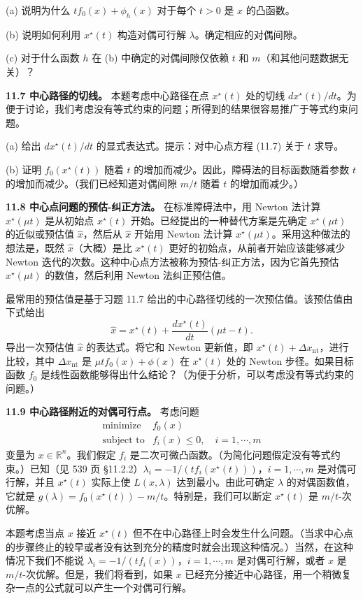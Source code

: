 \documentclass[UTF8,12pt,a4paper,fontset=fandol]{ctexart}
\begin{document}
(a) 说明为什么 $tf_0(x)+\phi_h(x)$ 对于每个 $t>0$ 是 $x$ 的凸函数。

(b) 说明如何利用 $x^\star(t)$ 构造对偶可行解 $\lambda$。确定相应的对偶间隙。

(c) 对于什么函数 $h$ 在 (b) 中确定的对偶间隙仅依赖 $t$ 和 $m$（和其他问题数据无关）？

\noindent\textbf{11.7 中心路径的切线。} 本题考虑中心路径在点 $x^\star(t)$ 处的切线 $dx^\star(t)/dt$。为便于讨论，我们考虑没有等式约束的问题；所得到的结果很容易推广于等式约束问题。

(a) 给出 $dx^\star(t)/dt$ 的显式表达式。提示：对中心点方程 (11.7) 关于 $t$ 求导。

(b) 证明 $f_0(x^\star(t))$ 随着 $t$ 的增加而减少。因此，障碍法的目标函数随着参数 $t$ 的增加而减少。（我们已经知道对偶间隙 $m/t$ 随着 $t$ 的增加而减少。）

\noindent\textbf{11.8 中心点问题的预估-纠正方法。} 在标准障碍法中，用 Newton 法计算 $x^\star(\mu t)$ 是从初始点 $x^\star(t)$ 开始。已经提出的一种替代方案是先确定 $x^\star(\mu t)$ 的近似或预估值 $\hat{x}$，然后从 $\hat{x}$ 开始用 Newton 法计算 $x^\star(\mu t)$。采用这种做法的想法是，既然 $\hat{x}$（大概）是比 $x^\star(t)$ 更好的初始点，从前者开始应该能够减少 Newton 迭代的次数。这种中心点方法被称为预估-纠正方法，因为它首先预估 $x^\star(\mu t)$ 的数值，然后利用 Newton 法纠正预估值。

最常用的预估值是基于习题 11.7 给出的中心路径切线的一次预估值。该预估值由下式给出
\[
\hat{x}=x^\star(t)+\frac{dx^\star(t)}{dt}(\mu t-t).
\]
导出一次预估值 $\hat{x}$ 的表达式。将它和 Newton 更新值，即 $x^\star(t)+\Delta x_{\mathrm{nt}}$，进行比较，其中 $\Delta x_{\mathrm{nt}}$ 是 $\mu t f_0(x)+\phi(x)$ 在 $x^\star(t)$ 处的 Newton 步径。如果目标函数 $f_0$ 是线性函数能够得出什么结论？（为便于分析，可以考虑没有等式约束的问题。）

\noindent\textbf{11.9 中心路径附近的对偶可行点。} 考虑问题
\[
\begin{array}{ll}
\text{minimize} & f_0(x)\\
\text{subject to} & f_i(x)\leq 0,\quad i=1,\cdots,m
\end{array}
\]
变量为 $x\in\mathbb{R}^n$。我们假定 $f_i$ 是二次可微凸函数。（为简化问题假定没有等式约束。）已知（见 539 页 \S11.2.2）$\lambda_i=-1/(tf_i(x^\star(t)))$，$i=1,\cdots,m$ 是对偶可行解，并且 $x^\star(t)$ 实际上使 $L(x,\lambda)$ 达到最小。由此可确定 $\lambda$ 的对偶函数值，它就是 $g(\lambda)=f_0(x^\star(t))-m/t$。特别是，我们可以断定 $x^\star(t)$ 是 $m/t$-次优解。

本题考虑当点 $x$ 接近 $x^\star(t)$ 但不在中心路径上时会发生什么问题。（当求中心点的步骤终止的较早或者没有达到充分的精度时就会出现这种情况。）当然，在这种情况下我们不能说 $\lambda_i=-1/(tf_i(x))$，$i=1,\cdots,m$ 是对偶可行解，或者 $x$ 是 $m/t$-次优解。但是，我们将看到，如果 $x$ 已经充分接近中心路径，用一个稍微复杂一点的公式就可以产生一个对偶可行解。
\end{document}
